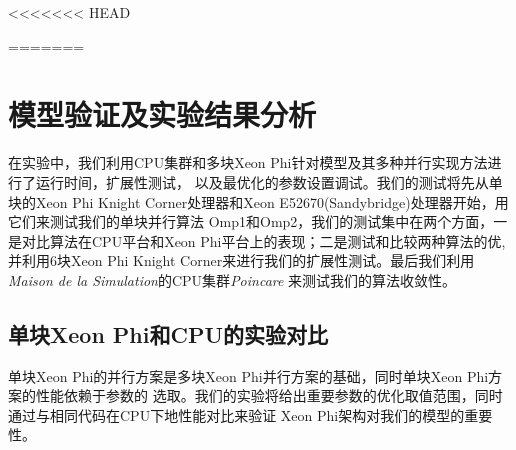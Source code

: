 <<<<<<< HEAD


=======
\chapter{模型验证及实验结果分析}
\label{chap:exp}

在实验中，我们利用CPU集群和多块Xeon Phi针对模型及其多种并行实现方法进行了运行时间，扩展性测试，
以及最优化的参数设置调试。我们的测试将先从单块的Xeon Phi Knight Corner处理器和Xeon E52670(Sandybridge)处理器开始，用它们来测试我们的单块并行算法
Omp1和Omp2，我们的测试集中在两个方面，一是对比算法在CPU平台和Xeon Phi平台上的表现；二是测试和比较两种算法的优, 
并利用6块Xeon Phi Knight Corner来进行我们的扩展性测试。最后我们利用\textsl{Maison de la Simulation}的CPU集群\textsl{Poincare}
来测试我们的算法收敛性。
\section{单块Xeon Phi和CPU的实验对比} %
\label{sec:singleMIC-CPU}
单块Xeon Phi的并行方案是多块Xeon Phi并行方案的基础，同时单块Xeon Phi方案的性能依赖于参数的
选取。我们的实验将给出重要参数的优化取值范围，同时通过与相同代码在CPU下地性能对比来验证
Xeon Phi架构对我们的模型的重要性。

